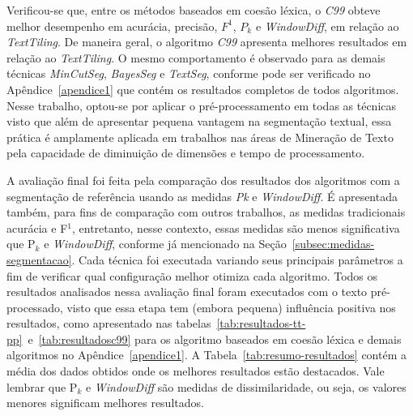 Verificou-se que, entre os métodos baseados em coesão léxica, o \textit{C99} obteve melhor desempenho em acurácia, precisão, $F^1$, $P_k$ e \textit{WindowDiff}, em relação ao \textit{TextTiling}. De maneira geral, o algoritmo \textit{C99} apresenta melhores resultados em relação ao \textit{TextTiling}. 
O mesmo comportamento é observado para as demais técnicas \textit{MinCutSeg}, \textit{BayesSeg} e \textit{TextSeg}, conforme pode ser verificado no Apêndice~\ref{apendice1} que contém os resultados completos de todos algoritmos.
Nesse trabalho, optou-se por aplicar o pré-processamento em todas as técnicas visto que além de apresentar pequena vantagem na segmentação textual, essa prática é amplamente aplicada em trabalhos nas áreas de Mineração de Texto pela capacidade de diminuição de dimensões e tempo de processamento. 















A avaliação final foi feita pela comparação dos resultados dos algoritmos com a segmentação de referência usando as medidas \textit{Pk} e \textit{WindowDiff}. É apresentada também, para fins de comparação com outros trabalhos, as medidas tradicionais acurácia e F$^1$, entretanto, nesse contexto, essas medidas são menos significativa que P$_k$ e \textit{WindowDiff}, conforme já mencionado na Seção~\ref{subsec:medidas-segmentacao}. 
Cada técnica foi executada variando seus principais parâmetros a fim de verificar qual configuração melhor otimiza cada algoritmo. 
Todos os resultados analisados nessa avaliação final foram executados com o texto pré-processado, visto que essa etapa tem (embora pequena) influência positiva nos resultados, como apresentado nas tabelas~\ref{tab:resultados-tt-pp}~e~\ref{tab:resultadosc99} para os algoritmo baseados em coesão léxica e demais algoritmos no Apêndice~\ref{apendice1}.
%
A Tabela~\ref{tab:resumo-resultados} contém a média dos dados obtidos onde os melhores resultados estão destacados. Vale lembrar que P$_k$ e \textit{WindowDiff} são medidas de dissimilaridade, ou seja, os valores menores significam melhores resultados.



